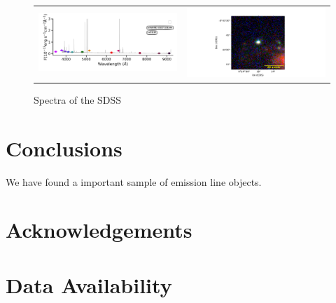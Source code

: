 \documentclass[fleqn,usenatbib]{mnras}
\begin{document}
\begin{figure}
\begin{tabular}{ll}
    \includegraphics[trim=10 0 10 20, clip]{Figs/spec-1089-52913-0196-STRIPE82-0007-024265.pdf} & \includegraphics[width=0.4\linewidth, trim=10 0 10 20, clip]{Figs/STRIPE82-0007-024265_3-0_100_r.pdf} \\
  \end{tabular}
  \caption{Spectra of the SDSS}
  \label{fig:color-diagram}
\end{figure}

\section{Conclusions}

We have found a important sample of emission line objects.

\section*{Acknowledgements}


\section*{Data Availability}









\end{document}

